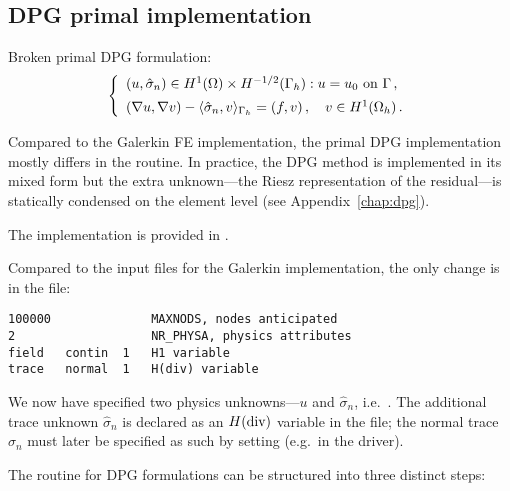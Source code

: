 \subsection{DPG primal implementation}
\label{sec:poisson-primal}

Broken primal DPG formulation:
\[
\left\{
\begin{array}{llll}
	(u, \hat \sigma_n) \in H^1(\Omega) \times H^{-1/2}(\Gamma_h): u = u_0 \text{ on } \Gamma \, , \\[5pt]
	(\nabla u, \nabla v) - \langle \hat \sigma_n , v \rangle_{\Gamma_h} 
	= (f,v) \, ,\quad v \in H^1(\Omega_h) \, .
\end{array}
\right.
\]

Compared to the Galerkin FE implementation, the primal DPG implementation mostly differs in the  routine. In practice, the DPG method is implemented in its mixed form \cite{demkowicz2017dpg} but the extra unknown---the Riesz representation of the residual---is statically condensed on the element level (see Appendix~\ref{chap:dpg}).

The implementation is provided in .

Compared to the input files for the Galerkin implementation, the only change is in the  file:
\begin{lstlisting}[caption=\file{POISSON/PRIMAL\_DPG/input/physics} input file.]
100000              MAXNODS, nodes anticipated
2                   NR_PHYSA, physics attributes
field   contin  1   H1 variable
trace   normal  1   H(div) variable
\end{lstlisting}
We now have specified two physics unknowns---$u$ and $\hat \sigma_n$, i.e.~. The additional trace unknown $\hat \sigma_n$ is declared as an $H(\text{div})$ variable in the  file; the normal trace $\hat \sigma_n$ must later be specified as such by setting  (e.g.~in the  driver).

The  routine for DPG formulations can be structured into three distinct steps:
\vskip 5pt

